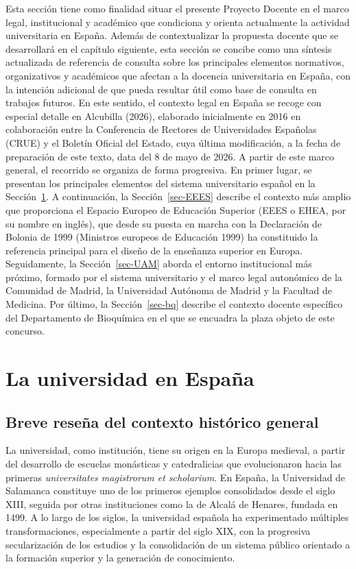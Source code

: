 \documentclass[
  11pt,
  a4paper,
  twoside]{scrreprt}
\begin{document}
Esta sección tiene como finalidad situar el presente Proyecto Docente en
el marco legal, institucional y académico que condiciona y orienta
actualmente la actividad universitaria en España. Además de
contextualizar la propuesta docente que se desarrollará en el capítulo
siguiente, esta sección se concibe como una síntesis actualizada de
referencia de consulta sobre los principales elementos normativos,
organizativos y académicos que afectan a la docencia universitaria en
España, con la intención adicional de que pueda resultar útil como base
de consulta en trabajos futuros. En este sentido, el contexto legal en
España se recoge con especial detalle en Alcubilla (2026), elaborado
inicialmente en 2016 en colaboración entre la Conferencia de Rectores de
Universidades Españolas (CRUE) y el Boletín Oficial del Estado, cuya
última modificación, a la fecha de preparación de este texto, data del 8
de mayo de 2026. A partir de este marco general, el recorrido se
organiza de forma progresiva. En primer lugar, se presentan los
principales elementos del sistema universitario español en la
Sección~\ref{sec-31}. A continuación, la Sección~\ref{sec-EEES} describe
el contexto más amplio que proporciona el Espacio Europeo de Educación
Superior (EEES o EHEA, por su nombre en inglés), que desde su puesta en
marcha con la Declaración de Bolonia de 1999 (Ministros europeos de
Educación 1999) ha constituido la referencia principal para el diseño de
la enseñanza superior en Europa. Seguidamente, la Sección~\ref{sec-UAM}
aborda el entorno institucional más próximo, formado por el sistema
universitario y el marco legal autonómico de la Comunidad de Madrid, la
Universidad Autónoma de Madrid y la Facultad de Medicina. Por último, la
Sección~\ref{sec-bq} describe el contexto docente específico del
Departamento de Bioquímica en el que se encuadra la plaza objeto de este
concurso.

\section{La universidad en España}\label{sec-31}

\subsection{Breve reseña del contexto histórico
general}\label{breve-reseuxf1a-del-contexto-histuxf3rico-general}

La universidad, como institución, tiene su origen en la Europa medieval,
a partir del desarrollo de escuelas monásticas y catedralicias que
evolucionaron hacia las primeras \emph{universitates magistrorum et
scholarium}. En España, la Universidad de Salamanca constituye uno de
los primeros ejemplos consolidados desde el siglo XIII, seguida por
otras instituciones como la de Alcalá de Henares, fundada en 1499. A lo
largo de los siglos, la universidad española ha experimentado múltiples
transformaciones, especialmente a partir del siglo XIX, con la
progresiva secularización de los estudios y la consolidación de un
sistema público orientado a la formación superior y la generación de
conocimiento.
\end{document}
